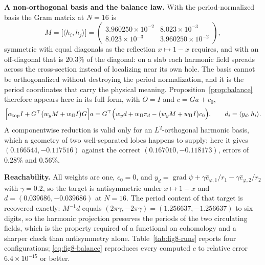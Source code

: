 \documentclass{article}
\DeclareMathOperator{\grad}{grad}
\newcommand{\ip}[2]{\langle #1,#2\rangle}
\begin{document}
\medskip
\noindent\textbf{A non-orthogonal basis and the balance law.}
With the period-normalized basis the Gram matrix at $N=16$ is
\[
  M=\bigl[\ip{h_{i}}{h_{j}}\bigr]
  =\begin{pmatrix}
     3.960250\times10^{-2} & 8.023\times10^{-3}\\
     8.023\times10^{-3} & 3.960250\times10^{-2}
   \end{pmatrix},
\]
symmetric with equal diagonals as the reflection $x\mapsto1-x$ requires, and
with an off-diagonal that is $20.3\%$ of the diagonal: on a slab each harmonic
field spreads across the cross-section instead of localizing near its own
hole. The basis cannot be orthogonalized without destroying the period
normalization, and it is the period coordinates that carry the physical
meaning. Proposition~\ref{prop:balance} therefore appears here in its full
form, with $O=I$ and $c=Ga+c_{0}$,
\begin{equation}\label{eq:fig8-balance}
  \Bigl[\alpha_{\rm top}I+G^{\top}\bigl(w_{y}M+w_{\Pi}I\bigr)G\Bigr]a
  =G^{\top}\Bigl(w_{y}d+w_{\Pi}\pi_{d}
      -\bigl(w_{y}M+w_{\Pi}I\bigr)c_{0}\Bigr),
  \qquad d_{i}=\ip{y_{d}}{h_{i}} .
\end{equation}
A componentwise reduction is valid only for an $L^{2}$-orthogonal harmonic
basis, which a geometry of two well-separated lobes happens to supply; here it
gives $(0.166544,-0.117516)$ against the correct $(0.167010,-0.118173)$,
errors of $0.28\%$ and $0.56\%$.

\medskip
\noindent\textbf{Reachability.}
All weights are one, $c_{0}=0$, and
$y_{d}=\grad\psi+\gamma\hat e_{\varphi,1}/r_{1}-\gamma\hat e_{\varphi,2}/r_{2}$
with $\gamma=0.2$, so the target is antisymmetric under $x\mapsto1-x$ and
$d=(0.039686,-0.039686)$ at $N=16$. The period content of that target is
recovered exactly: $M^{-1}d$ equals
$(2\pi\gamma,-2\pi\gamma)=(1.256637,-1.256637)$ to six digits, so the harmonic
projection preserves the periods of the two circulating fields, which is the
property required of a functional on cohomology and a sharper check than
antisymmetry alone. Table~\ref{tab:fig8-runs} reports four configurations;
\eqref{eq:fig8-balance} reproduces every computed $c$ to relative error
$6.4\times10^{-15}$ or better.
\end{document}
